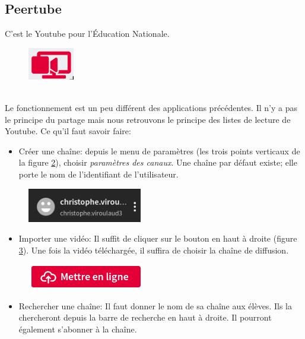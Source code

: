 \documentclass[a4paper,11pt]{article}
\begin{document}
\begin{Form}
\subsection{Peertube}
C'est le Youtube pour l'Éducation Nationale.
\begin{figure}[!h]
\centering
\includegraphics[width=2cm]{ressources/peertube.png}
\label{peertube}
\end{figure}
\\Le fonctionnement est un peu différent des applications précédentes. Il n'y a pas le principe du partage mais nous retrouvons le principe des listes de lecture de Youtube. Ce qu'il faut savoir faire:
\begin{itemize}
\item Créer une chaîne: depuis le menu de paramètres (les trois points verticaux de la figure \ref{param-peertube}), choisir \emph{paramètres des canaux}. Une chaîne par défaut existe; elle porte le nom de l'identifiant de l'utilisateur.
\end{itemize}
\begin{figure}[!h]
\centering
\includegraphics[width=5cm]{ressources/comptepeertube.png}
\label{param-peertube}
\end{figure}
\begin{itemize}
\item Importer une vidéo: Il suffit de cliquer sur le bouton en haut à droite (figure \ref{enligne}). Une fois la vidéo téléchargée, il suffira de choisir la chaîne de diffusion.
\end{itemize}
\begin{figure}[!h]
\centering
\includegraphics[width=5cm]{ressources/mettreenligne.png}
\label{enligne}
\end{figure}
\begin{itemize}
\item Rechercher une chaîne: Il faut donner le nom de sa chaîne aux élèves. Ils la chercheront depuis la barre de recherche en haut à droite. Il pourront également s'abonner à la chaîne.
\end{itemize}

\end{Form}
\end{document}

